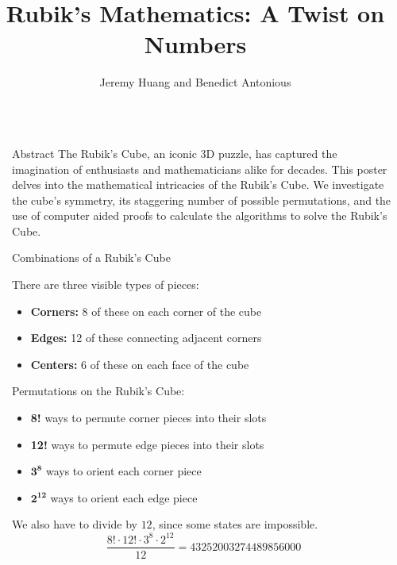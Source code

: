 \documentclass[final]{beamer}
\title{Rubik's Mathematics: A Twist on Numbers}
\author{Jeremy Huang and Benedict Antonious}
\institute[shortinst]{University of Colorado Boulder}
\newlength{\sepwidth}
\newlength{\colwidth}
\newcommand{\separatorcolumn}{\begin{column}{\sepwidth}\end{column}}
\begin{document}
\begin{frame}[t]
\begin{columns}[t]
\separatorcolumn

\begin{column}{\colwidth}

  \begin{block}{Abstract}
    \large The Rubik's Cube, an iconic 3D puzzle, has captured the imagination of enthusiasts and mathematicians 
    alike for decades. This poster delves into the mathematical intricacies of the Rubik's Cube. We investigate the 
    cube's symmetry, its staggering number of possible permutations, and the use of computer aided proofs to 
    calculate the algorithms to solve the Rubik's Cube. %


  \end{block}

  \begin{block}{Combinations of a Rubik's Cube}

    \large There are three visible types of pieces:

    \begin{itemize} %
      \item \textbf{Corners:} 8 of these on each corner of the cube
      \item \textbf{Edges:} 12 of these connecting adjacent corners
      \item \textbf{Centers:} 6 of these on each face of the cube
    \end{itemize}

    Permutations on the Rubik's Cube: 

    \begin{itemize} %
      \item \textbf{8!} ways to permute corner pieces into their slots
      \item \textbf{12!} ways to permute edge pieces into their slots
      \item $\mathbf{3^8}$ ways to orient each corner piece
      \item $\mathbf{2^{12}}$ ways to orient each edge piece
    \end{itemize}
    We also have to divide by $12$, since some states are impossible. \\

    $$ \displaystyle\frac{8!\cdot 12! \cdot 3^8 \cdot 2^{12}}{12} = 43252003274489856000 $$ \\


\end{block}
\end{column}
\end{columns}
\end{frame}
\end{document}

